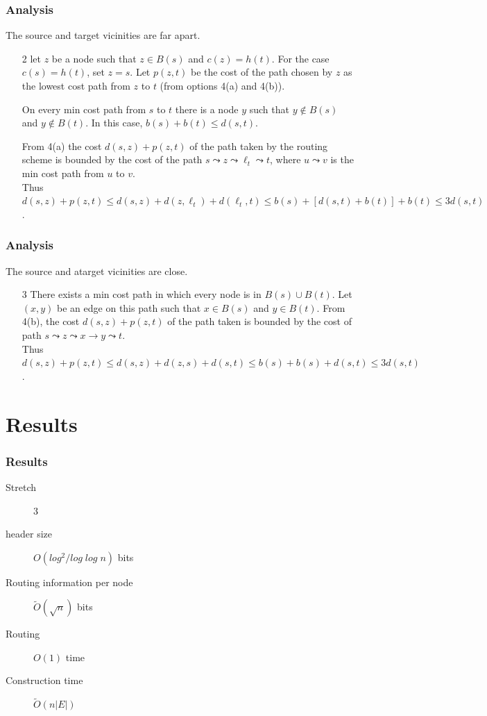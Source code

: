 \documentclass[10pt, compress]{beamer}
\begin{document}
\begin{frame}[fragile]
  \frametitle{Analysis}
    The source and target vicinities are far apart.
    \begin{enumerate}
        \item[2] let $z$ be a node such that $z\in B(s)$ and $c(z)=h(t)$. For the case $c(s)=h(t)$, set $z=s$. Let $p(z,t)$ be the cost of the path chosen by $z$ as the lowest cost path from $z$ to $t$ (from options 4(a) and 4(b)).

        On every min cost path from $s$ to $t$ there is a node $y$ such that $y\not\in B(s)$ and $y\not\in B(t)$. In this case, $b(s)+b(t)\leq d(s,t)$.

        From 4(a) the cost $d(s,z)+p(z, t)$ of the path taken by the routing scheme is bounded by the cost of the path $s\leadsto z\leadsto \ell_t\leadsto t$, where $u\leadsto v$ is the min cost path from $u$ to $v$.\\
        Thus $d(s,z)+p(z,t) \leq d(s,z)+d(z,\ell_t)+d(\ell_t,t) \leq b(s) + [d(s,t) + b(t)] + b(t) \leq 3d(s,t)$.
    \end{enumerate}
\end{frame}

\begin{frame}[fragile]
  \frametitle{Analysis}
    The source and atarget vicinities are close.
    \begin{enumerate}
        \item[3] There exists a min cost path in which every node is in $B(s)\cup B(t)$. Let $(x,y)$ be an edge on this path such that $x\in B(s)$ and $y\in B(t)$. From 4(b), the cost $d(s,z)+p(z,t)$ of the path taken is bounded by the cost of path $s\leadsto z\leadsto x\rightarrow y \leadsto t$.\\
        Thus $d(s,z)+p(z,t) \leq d(s,z) + d(z,s) + d(s,t) \leq b(s)+b(s)+d(s,t)\leq 3d(s,t)$.
    \end{enumerate}
\end{frame}

\section{Results}

\begin{frame}[fragile]
  \frametitle{Results}

  \begin{description}
    \item[Stretch] 3
    \item[header size] $O(log^2/log\;log\;n)$ bits
    \item[Routing information per node] $\tilde{O}(\sqrt{n})$ bits
    \item[Routing] $O(1)$ time
    \item[Construction time] $\tilde{O}(n|E|)$
  \end{description}

\end{frame}
\end{document}
